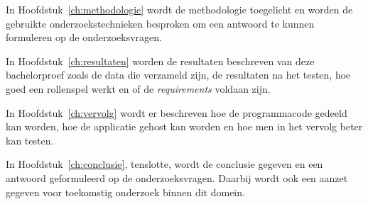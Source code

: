In Hoofdstuk~\ref{ch:methodologie} wordt de methodologie toegelicht en worden de gebruikte onderzoekstechnieken besproken om een antwoord te kunnen formuleren op de onderzoeksvragen.

In Hoofdstuk~\ref{ch:resultaten} worden de resultaten beschreven van deze bachelorproef zoals de data die verzameld zijn, de resultaten na het testen, hoe goed een rollenspel werkt en of de \textit{requirements} voldaan zijn.

In Hoofdstuk~\ref{ch:vervolg} wordt er beschreven hoe de programmacode gedeeld kan worden, hoe de applicatie gehost kan worden en hoe men in het vervolg beter kan testen.


In Hoofdstuk~\ref{ch:conclusie}, tenslotte, wordt de conclusie gegeven en een antwoord geformuleerd op de onderzoeksvragen. Daarbij wordt ook een aanzet gegeven voor toekomstig onderzoek binnen dit domein.